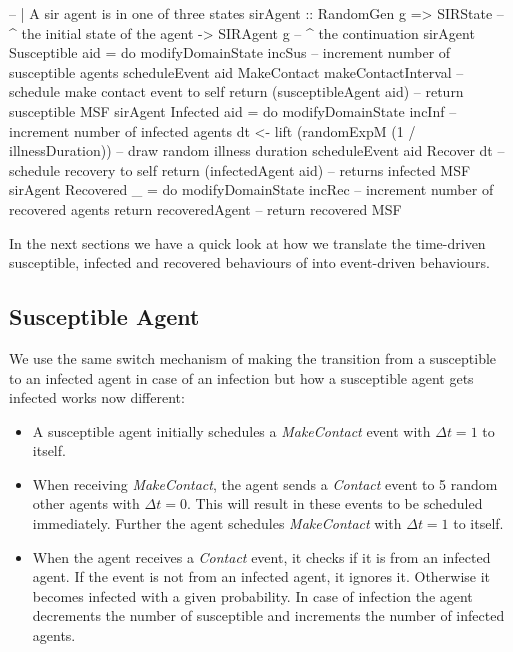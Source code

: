 \begin{HaskellCode}
-- | A sir agent is in one of three states
sirAgent :: RandomGen g 
         => SIRState    -- ^ the initial state of the agent
         -> SIRAgent g  -- ^ the continuation
sirAgent Susceptible aid = do
    modifyDomainState incSus -- increment number of susceptible agents
    scheduleEvent aid MakeContact makeContactInterval -- schedule make contact event to self
    return (susceptibleAgent aid) -- return susceptible MSF
sirAgent Infected aid = do
    modifyDomainState incInf -- increment number of infected agents
    dt <- lift (randomExpM (1 / illnessDuration)) -- draw random illness duration
    scheduleEvent aid Recover dt -- schedule recovery to self
    return (infectedAgent aid) -- returns infected MSF 
sirAgent Recovered _ = do
    modifyDomainState incRec -- increment number of recovered agents
    return recoveredAgent -- return recovered MSF
\end{HaskellCode}

In the next sections we have a quick look at how we translate the time-driven susceptible, infected and recovered behaviours of into event-driven behaviours.

\subsection{Susceptible Agent}
We use the same switch mechanism of making the transition from a susceptible to an infected agent in case of an infection but how a susceptible agent gets infected works now different:

\begin{itemize}
	\item A susceptible agent initially schedules a \textit{MakeContact} event with $\Delta t = 1$ to itself.
	\item When receiving \textit{MakeContact}, the agent sends a \textit{Contact} event to 5 random other agents with $\Delta t = 0$. This will result in these events to be scheduled immediately. Further the agent schedules \textit{MakeContact} with $\Delta t = 1$ to itself.
	\item When the agent receives a \textit{Contact} event, it checks if it is from an infected agent. If the event is not from an infected agent, it ignores it. Otherwise it becomes infected with a given probability. In case of infection the agent decrements the number of susceptible and increments the number of infected agents.
\end{itemize}

